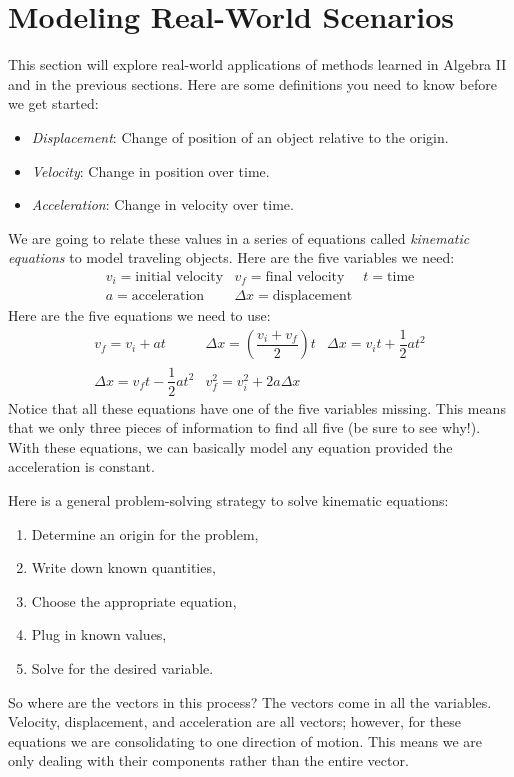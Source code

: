 \documentclass[lang=en,11pt]{elegantbook}
\begin{document}
\section{Modeling Real-World Scenarios}
\noindent This section will explore real-world applications of methods learned in Algebra II and in the previous sections.  Here are some definitions you need to know before we get started: \begin{itemize}
    \item \textit{Displacement}: Change of position of an object relative to the origin.
    \item \textit{Velocity}: Change in position over time.
    \item \textit{Acceleration}: Change in velocity over time.
\end{itemize}
We are going to relate these values in a series of equations called \textit{kinematic equations} to model traveling objects. Here are the five variables we need: $$\begin{matrix} v_i=\text{initial velocity} & v_f=\text{final velocity} & t=\text{time} \\ a=\text{acceleration} & \Delta x=\text{displacement} \end{matrix}$$ Here are the five equations we need to use: $$\begin{matrix} v_f=v_i+at & \Delta x=\left(\dfrac{v_i+v_f}{2}\right)t & \Delta x=v_it+\dfrac{1}{2}at^2 \\ \Delta x=v_ft-\dfrac{1}{2}at^2 & v_f^2=v_i^2+2a\Delta x\end{matrix}$$
Notice that all these equations have one of the five variables missing.  This means that we only three pieces of information to find all five (be sure to see why!).  With these equations, we can basically model any equation provided the acceleration is constant.

Here is a general problem-solving strategy to solve kinematic equations: \begin{enumerate}
    \item Determine an origin for the problem,
    \item Write down known quantities,
    \item Choose the appropriate equation,
    \item Plug in known values,
    \item Solve for the desired variable.
\end{enumerate}
So where are the vectors in this process? The vectors come in all the variables.  Velocity, displacement, and acceleration are all vectors; however, for these equations we are consolidating to one direction of motion.  This means we are only dealing with their components rather than the entire vector.
\end{document}
